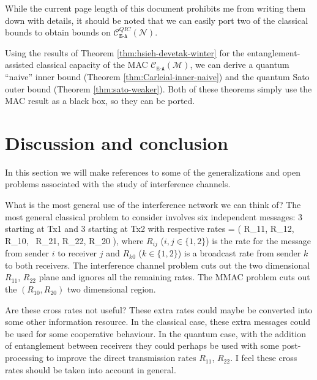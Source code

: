 \documentclass[aps,11pt,twoside,letterpaper]{article}
\newcommand{\mcal}{\mathcal}
\begin{document}
		While the current page length of this document prohibits me from
		writing them down with details, it should be noted that
		we can easily port two of the classical bounds to obtain
		bounds on $\mathcal{C}^{QIC}_{\texttt{E-A}}\!\left(\mathcal{N}\right)$.
		
		Using the results of Theorem \ref{thm:hsieh-devetak-winter} for the 
		entanglement-assisted classical capacity of the MAC $\mcal{C}_{\texttt{E-A}}(\mcal{M})$,
		we can derive a quantum ``naive'' inner bound (Theorem \ref{thm:Carleial-inner-naive})
		and the quantum Sato outer bound (Theorem \ref{thm:sato-weaker}).
		Both of these theorems simply use the MAC result as a black box, so they can be ported.
		
		



		

		
\section{Discussion and conclusion}		\label{section:discussion}

    In this section we will make references to some of the generalizations and open problems
    associated with the study of interference channels.
    
    


    What is the most general use of the interference network we can think of?
    The most general classical problem to consider involves six independent
    messages: 3 starting at Tx1 and 3 starting at Tx2 with respective rates
    \be
    		=	( R_{11}, R_{12}, R_{10},  \ R_{21}, R_{22}, R_{20} ),
    \ee
    where $R_{ij}$ ($i,j \in \{1,2\}$) is the rate for the message from sender $i$
    to receiver $j$ and $R_{k0}$ ($k \in \{1,2\}$) is a broadcast rate from sender $k$
    to both receivers.
    The interference channel problem cuts out the two dimensional $R_{11}$, $R_{22}$ plane
    and ignores all the remaining rates.
    The MMAC problem cuts out the $(R_{10}, R_{20})$  two dimensional region.
    
        Are these cross rates not useful? 
        These extra rates could maybe be converted into some other information resource.
        In the classical case, these extra messages could be used for some cooperative 
        behaviour. 
	In the quantum case, with the addition of entanglement between receivers they 
	could perhaps be used with some post-processing to improve the direct
	transmission rates $R_{11}$, $R_{22}$.
        I feel these cross rates should be taken into account in general.
\end{document}
